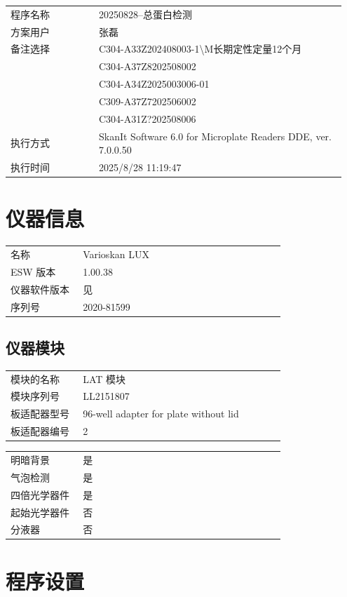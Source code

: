 \documentclass[UTF8,10pt,a4paper,fontset=fandol]{ctexart}
\begin{document}
\begin{tabular}{p{0.25\linewidth}p{0.70\linewidth}}
程序名称 & 20250828--总蛋白检测\\
方案用户 & 张磊\\
备注选择 & C304-A33Z202408003-1\textbackslash M长期定性定量12个月\\
& C304-A37Z8202508002\\
& C304-A34Z2025003006-01\\
& C309-A37Z7202506002\\
& C304-A31Z?202508006\\
执行方式 & SkanIt Software 6.0 for Microplate Readers DDE, ver. 7.0.0.50\\
执行时间 & 2025/8/28 11:19:47
\end{tabular}

\section*{仪器信息}

\begin{tabular}{p{0.25\linewidth}p{0.70\linewidth}}
名称 & Varioskan LUX\\
ESW 版本 & 1.00.38\\
仪器软件版本 & 见\\
序列号 & 2020-81599
\end{tabular}

\subsection*{仪器模块}

\begin{tabular}{p{0.25\linewidth}p{0.70\linewidth}}
模块的名称 & LAT 模块\\
模块序列号 & LL2151807\\
板适配器型号 & 96-well adapter for plate without lid\\
板适配器编号 & 2
\end{tabular}

\begin{tabular}{p{0.25\linewidth}p{0.70\linewidth}}
明暗背景 & 是\\
气泡检测 & 是\\
四倍光学器件 & 是\\
起始光学器件 & 否\\
分液器 & 否
\end{tabular}

\section*{程序设置}
\end{document}
